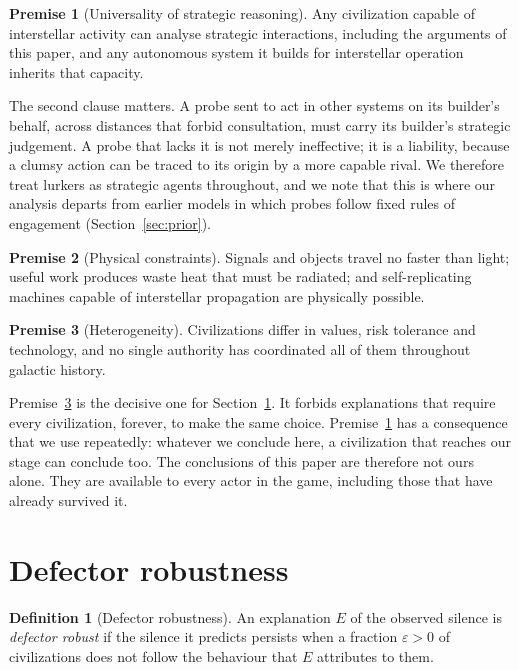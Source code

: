 \documentclass[preprint,12pt]{elsarticle}
\theoremstyle{definition}
\newtheorem{definition}{Definition}
\newtheorem{premise}{Premise}
\begin{document}
\begin{premise}[Universality of strategic reasoning]
\label{p:reason}
Any civilization capable of interstellar activity can analyse strategic interactions, including the arguments of this paper, and any autonomous system it builds for interstellar operation inherits that capacity.
\end{premise}

The second clause matters. A probe sent to act in other systems on its builder's behalf, across distances that forbid consultation, must carry its builder's strategic judgement. A probe that lacks it is not merely ineffective; it is a liability, because a clumsy action can be traced to its origin by a more capable rival. We therefore treat lurkers as strategic agents throughout, and we note that this is where our analysis departs from earlier models in which probes follow fixed rules of engagement (Section~\ref{sec:prior}).

\begin{premise}[Physical constraints]
\label{p:physics}
Signals and objects travel no faster than light; useful work produces waste heat that must be radiated; and self-replicating machines capable of interstellar propagation are physically possible.
\end{premise}

\begin{premise}[Heterogeneity]
\label{p:hetero}
Civilizations differ in values, risk tolerance and technology, and no single authority has coordinated all of them throughout galactic history.
\end{premise}

Premise~\ref{p:hetero} is the decisive one for Section~\ref{sec:robustness}. It forbids explanations that require every civilization, forever, to make the same choice. Premise~\ref{p:reason} has a consequence that we use repeatedly: whatever we conclude here, a civilization that reaches our stage can conclude too. The conclusions of this paper are therefore not ours alone. They are available to every actor in the game, including those that have already survived it.

\section{Defector robustness}
\label{sec:robustness}

\begin{definition}[Defector robustness]
An explanation $E$ of the observed silence is \emph{defector robust} if the silence it predicts persists when a fraction $\varepsilon > 0$ of civilizations does not follow the behaviour that $E$ attributes to them.
\end{definition}
\end{document}
